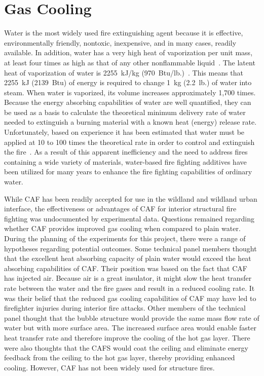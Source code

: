 \documentclass[12pt,oneside]{book}
\begin{document}
\section{Gas Cooling}
\label{sec:Gas_Cooling_discuss}
 
Water is the most widely used fire extinguishing agent because it is effective, environmentally friendly, nontoxic, inexpensive, and in many cases, readily available. In addition, water has a very high heat of vaporization per unit mass, at least four times as high as that of any other nonflammable liquid~\cite{NFPA}. The latent heat of vaporization of water is 2255~kJ/kg (970~Btu/lb.)~\cite{NFPA}. This means that 2255~kJ (2139~Btu) of energy is required to change 1~kg (2.2~lb.) of water into steam. When water is vaporized, its volume increases approximately 1,700 times. Because the energy absorbing capabilities of water are well quantified, they can be used as a basis to calculate the theoretical minimum delivery rate of water needed to extinguish a burning material with a known heat (energy) release rate. Unfortunately, based on experience it has been estimated that water must be applied at 10 to 100 times the theoretical rate in order to control and extinguish the fire~\cite{Friedman:2}. As a result of this apparent inefficiency and the need to address fires containing a wide variety of materials, water-based fire fighting additives have been utilized for many years to enhance the fire fighting capabilities of ordinary water.

While CAF has been readily accepted for use in the wildland and wildland urban interface, the effectiveness or advantages of CAF for interior structural fire fighting was undocumented by experimental data. Questions remained regarding whether CAF provides improved gas cooling when compared to plain water. During the planning of the experiments for this project, there were a range of hypotheses regarding potential outcomes. Some technical panel members thought that the excellent heat absorbing capacity of plain water would exceed the heat absorbing capabilities of CAF. Their position was based on the fact that CAF has injected air. Because air is a great insulator, it might slow the heat transfer rate between the water and the fire gases and result in a reduced cooling rate. It was their belief that the reduced gas cooling capabilities of CAF may have led to firefighter injuries during interior fire attacks. Other members of the technical panel thought that the bubble structure would provide the same mass flow rate of water but with more surface area. The increased surface area would enable faster heat transfer rate and therefore improve the cooling of the hot gas layer. There were also thoughts that the CAFS would coat the ceiling and eliminate energy feedback from the ceiling to the hot gas layer, thereby providing enhanced cooling. However, CAF has not been widely used for structure fires.
\end{document}
